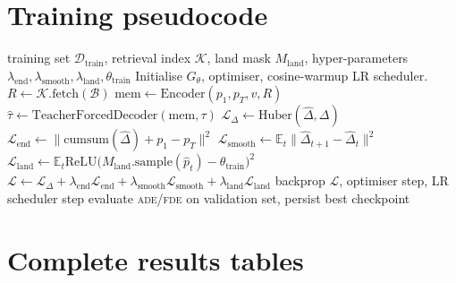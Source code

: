 \documentclass[oneside, a4paper, onecolumn, 11pt]{article}
\newcommand{\ade}{\textsc{ade}}
\newcommand{\fde}{\textsc{fde}}
\begin{document}
\appendix
\section{Training pseudocode}\label{app:train}

\begin{algorithm}[H]
\caption{Training loop for the production model.}
\label{alg:train}
\begin{algorithmic}[1]
\REQUIRE training set $\mathcal{D}_{\mathrm{train}}$,
         retrieval index $\mathcal{K}$,
         land mask $M_{\mathrm{land}}$,
         hyper-parameters
         $\lambda_{\mathrm{end}},\lambda_{\mathrm{smooth}},
          \lambda_{\mathrm{land}},\theta_{\mathrm{train}}$
\STATE Initialise $G_\theta$, optimiser, cosine-warmup LR scheduler.
    \STATE $R \leftarrow \mathcal{K}.\text{fetch}(\mathcal{B})$
    \STATE $\mathrm{mem} \leftarrow
            \text{Encoder}(p_1, p_T, v, R)$
    \STATE $\hat\tau \leftarrow
            \text{TeacherForcedDecoder}(\mathrm{mem}, \tau)$
    \STATE $\mathcal{L}_\Delta \leftarrow
            \text{Huber}(\hat\Delta, \Delta)$
    \STATE $\mathcal{L}_{\mathrm{end}} \leftarrow
            \| \mathrm{cumsum}(\hat\Delta) + p_1 - p_T \|^2$
    \STATE $\mathcal{L}_{\mathrm{smooth}} \leftarrow
            \mathbb{E}_t \|\hat\Delta_{t+1} - \hat\Delta_t\|^2$
    \STATE $\mathcal{L}_{\mathrm{land}} \leftarrow
            \mathbb{E}_t \mathrm{ReLU}\bigl(M_{\mathrm{land}}.\text{sample}(\hat p_t)
                                    - \theta_{\mathrm{train}}\bigr)^2$
    \STATE $\mathcal{L} \leftarrow
            \mathcal{L}_\Delta
            + \lambda_{\mathrm{end}}\mathcal{L}_{\mathrm{end}}
            + \lambda_{\mathrm{smooth}}\mathcal{L}_{\mathrm{smooth}}
            + \lambda_{\mathrm{land}}\mathcal{L}_{\mathrm{land}}$
    \STATE backprop $\mathcal{L}$, optimiser step, LR scheduler step
  \ENDFOR
  \STATE evaluate \ade/\fde{} on validation set, persist best checkpoint
\ENDFOR
\end{algorithmic}
\end{algorithm}

\section{Complete results tables}\label{app:results}
\end{document}
